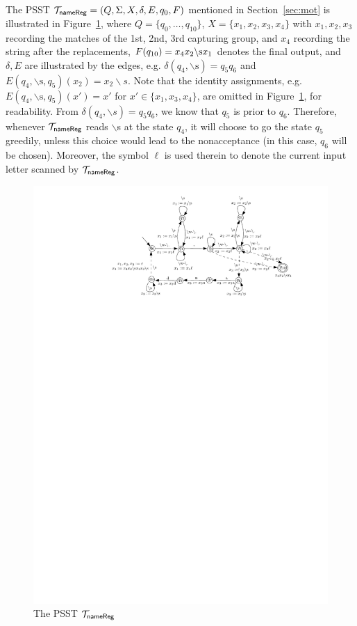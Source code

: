 \begin{example}
The PSST $\mathcal{T}_{\sf nameReg}=(Q, \Sigma, X, \delta, E,  q_{0}, F)$ mentioned in Section~\ref{sec:mot} is illustrated in Figure~\ref{fig-psst-exmp}, where $Q = \{q_0, \dots, q_{10}\}$, $X= \{x_1, x_2, x_3, x_4\}$ with $x_1, x_2, x_3$ recording the matches of the 1st, 2nd, 3rd capturing group, and $x_4$ recording the string after the replacements, $F(q_{10}) = x_4 x_2 \backslash {\rm s} x_1$ denotes the final output, and $\delta, E$ are illustrated by the edges, e.g. $\delta(q_4, \backslash\mbox{s}) = q_5q_{6}$ and $E(q_4, \backslash\mbox{s}, q_5)(x_2) = x_2 \backslash s$.  Note that the identity assignments, e.g. $E(q_4, \backslash\mbox{s}, q_5)(x') = x'$ for $x' \in \{x_1, x_3, x_4\}$, are omitted in Figure~\ref{fig-psst-exmp}, for readability. From $\delta(q_4, \backslash s) = q_5q_{6}$, we know that $q_5$ is prior to $q_6$. Therefore, whenever $\mathcal{T}_{\sf nameReg}$ reads $\backslash$s at the state $q_4$,  it will choose to go the state $q_5$ greedily, unless this choice would lead to the nonacceptance (in this case, $q_6$ will be chosen). Moreover, the symbol $\ell$ is used therein to denote the current input letter scanned by $\mathcal{T}_{\sf nameReg}$.
\begin{figure}[ht]
\centering
\includegraphics{psst-exmp.pdf}
\caption{The PSST $\mathcal{T}_{\sf nameReg}$}
\label{fig-psst-exmp}
\end{figure}
\end{example}

